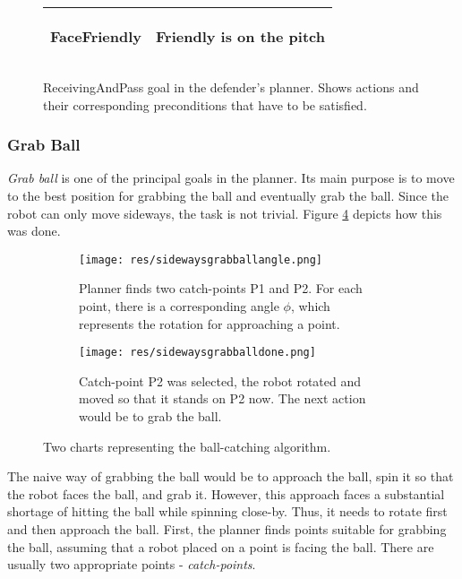 \begin{center}
\begin{figure}[H]
\begin{tabular}{ | l | p{110mm} | }
FaceFriendly &
\begin{compactitem}
\item Friendly is on the pitch
\end{compactitem}  \\ \hline
\end{tabular}
\par
\bigskip

\caption{ReceivingAndPass goal in the defender's planner. Shows actions and their corresponding preconditions that have to be satisfied.}

	\label{fig:receiveandpass}
\end{figure}
\end{center}

\subsubsection{Grab Ball}

\emph{Grab ball} is one of the principal goals in the planner. Its main purpose
is to move to the best position for grabbing the ball and eventually grab the
ball. Since the robot can only move sideways, the task is not trivial. Figure
\ref{fig:sidewaysgrabball} depicts how this was done.

\begin{figure}[H]
	\begin{center}
	\begin{subfigure}{0.5\textwidth}
  		\texttt{[image: res/sidewaysgrabballangle.png]}
  		\caption{Planner finds two catch-points P1 and P2. For each point, there is a corresponding angle $\phi$, which represents the rotation for approaching a point.}
  		\label{fig:sidewaysgrabballangle}
	\end{subfigure}%
	\begin{subfigure}{0.5\textwidth}
  		\texttt{[image: res/sidewaysgrabballdone.png]}
  		\caption{Catch-point P2 was selected, the robot rotated and moved so that it stands on P2 now. The next action would be to grab the ball. }
  		\label{fig:sidewaysgrabballdone}
	\end{subfigure}%
	
	\caption{Two charts representing the ball-catching algorithm. }
	\label{fig:sidewaysgrabball}
	\end{center}
\end{figure}


The naive way of grabbing the ball would be to approach the ball, spin it so
that the robot faces the ball, and grab it. However, this approach faces a
substantial shortage of hitting the ball while spinning close-by. Thus, it
needs to rotate first and then approach the ball. First, the planner finds
points suitable for grabbing the ball, assuming that a robot placed on a point
is facing the ball. There are usually two appropriate points -
\emph{catch-points}. 

